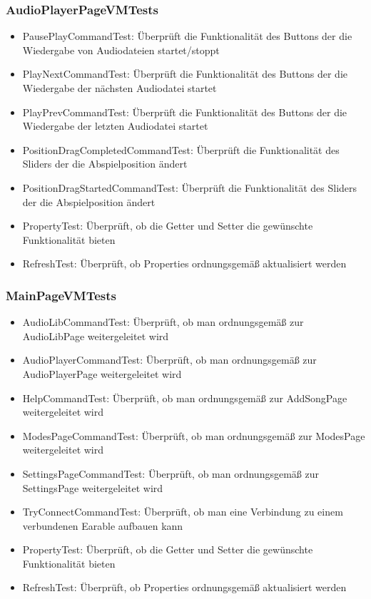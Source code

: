 \documentclass[../validierung.tex]{subfiles}
\begin{document}
		\subsubsection{AudioPlayerPageVMTests}
			\begin{itemize}
				\item PausePlayCommandTest: Überprüft die Funktionalität des Buttons der die Wiedergabe von Audiodateien startet/stoppt
				\item PlayNextCommandTest: Überprüft die Funktionalität des Buttons der die Wiedergabe der nächsten Audiodatei startet
				\item PlayPrevCommandTest: Überprüft die Funktionalität des Buttons der die Wiedergabe der letzten Audiodatei startet
				\item PositionDragCompletedCommandTest: Überprüft die Funktionalität des Sliders der die Abspielposition ändert
				\item PositionDragStartedCommandTest: Überprüft die Funktionalität des Sliders der die Abspielposition ändert
				\item PropertyTest: Überprüft, ob die Getter und Setter die gewünschte Funktionalität bieten
				\item RefreshTest: Überprüft, ob Properties ordnungsgemäß aktualisiert werden
			\end{itemize}
		\subsubsection{MainPageVMTests}
			\begin{itemize}
				\item AudioLibCommandTest: Überprüft, ob man ordnungsgemäß zur AudioLibPage weitergeleitet wird
				\item AudioPlayerCommandTest: Überprüft, ob man ordnungsgemäß zur AudioPlayerPage weitergeleitet wird
				\item HelpCommandTest: Überprüft, ob man ordnungsgemäß zur AddSongPage weitergeleitet wird
				\item ModesPageCommandTest: Überprüft, ob man ordnungsgemäß zur ModesPage weitergeleitet wird
				\item SettingsPageCommandTest: Überprüft, ob man ordnungsgemäß zur SettingsPage weitergeleitet wird
				\item TryConnectCommandTest: Überprüft, ob man eine Verbindung zu einem verbundenen Earable aufbauen kann
				\item PropertyTest: Überprüft, ob die Getter und Setter die gewünschte Funktionalität bieten
				\item RefreshTest: Überprüft, ob Properties ordnungsgemäß aktualisiert werden
			\end{itemize}
\end{document}
